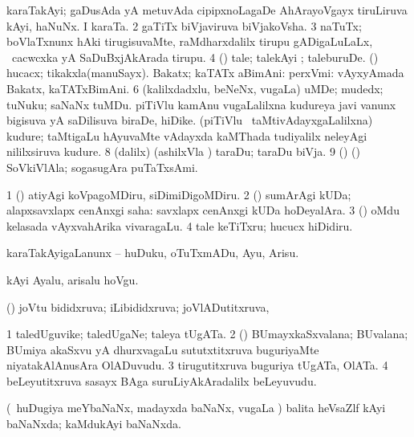\bentry
{}
\gl{\nA}
\bmng
\bnum
{} 
\banum
{} karaTakAyi; gaDusAda yA metuvAda cipipxnoLagaDe AhArayoVgayx tiruLiruva kAyi, haNuNx. 
 I karaTa. 
\eanum
\numie
\num{2} gaTiTx biVjaviruva biVjakoVsha. 
\num{3} naTuTx; boVlaTxnunx hAki tirugisuvaMte, raMdharxdalilx tirupu gADigaLuLaLx, \sA\ cacwcxka yA SaDuBxjAkArada tirupu. 
\num{4} (\ashi) tale; talekAyi ; taleburuDe. 
 (\ashi) 
\banum
{} hucacx; tikakxla(manuSayx). 
 Bakatx; kaTATx aBimAni: perxVmi:  vAyxyAmada Bakatx, kaTATxBimAni. 
\eanum
\numie
\num{6} (kalilxdadxlu, beNeNx, \mo vugaLa) uMDe; mudedx; tuNuku; saNaNx tuMDu. 
\banum
{} piTiVlu kamAnu \mo vugaLalilxna kudureya javi \mo vanunx bigisuva yA saDilisuva biraDe, hiDike. 
 (piTiVlu \mo\ taMtivAdayxgaLalilxna) kudure; taMtigaLu hAyuvaMte vAdayxda kaMThada tudiyalilx neleyAgi nililxsiruva kudure. 
\eanum
\numie
\num{8} (\bava dalilx) (ashilxVla \ashi) taraDu; taraDu biVja. 
\num{9} (\pArxparx) (\ashi) SoVkiVlAla; sogasugAra puTaTxsAmi. 
\enum
\emng

\noindent
\gl{\pagu}
\bmng
\bnum
\num{1} (\ashi) atiyAgi koVpagoMDiru, siDimiDigoMDiru. 
\num{2}  (\ashi) sumArAgi kUDa; alapxsavxlapx cenAnxgi saha:  savxlapx cenAnxgi kUDa hoDeyalAra. 
\num{3} (\rUpa) oMdu kelasada vAyxvahArika vivaragaLu. 
\num{4}  tale keTiTxru; hucucx hiDidiru. 
\enum
\emng
\eentry

\bentry
{}
\gl{\akirx}
\bmng
karaTakAyigaLanunx -- huDuku, oTuTxmADu, Ayu, Arisu. 
\emng

\noindent
\gl{\pagu}
\bmng
{} kAyi Ayalu, arisalu hoVgu. 
\emng
\eentry

\bentry
{}
\gl{\gu}
\bmng
(\savi) joVtu bididxruva; iLibididxruva; joVlADutitxruva, 
\emng
\eentry

\bentry
{}
\gl{\nA}
\bmng
\bnum
\num{1} taledUguvike; taledUgaNe; taleya tUgATa. 
\num{2} (\Kavi) BUmayxkaSxvalana; BUvalana; BUmiya akaSxvu yA dhurxvagaLu sututxtitxruva buguriyaMte niyatakAlAnusAra OlADuvudu. 
\num{3} tirugutitxruva buguriya tUgATa, OlATa. 
\num{4} beLeyutitxruva sasayx BAga suruLiyAkAradalilx beLeyuvudu. 
\enum
\emng
\eentry

\bentry
{}
\gl{\gu}
\bmng
(\sA\ huDugiya meYbaNaNx, madayxda baNaNx, \mo vugaLa \vi) balita heVsaZlf kAyi baNaNxda; kaMdukAyi baNaNxda. 
\emng
\eentry

